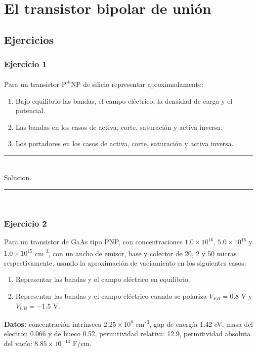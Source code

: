 
\chapter{El transistor bipolar de unión}



\section{Ejercicios}


\subsection{Ejercicio 1} 

Para un transistor P\textsuperscript{+}NP de silicio representar aproximadamente:
\begin{enumerate}[label=\alph*)]
    \item Bajo equilibrio las bandas, el campo eléctrico, la densidad de carga y el potencial.
    \item Las bandas en los casos de activa, corte, saturación y activa inversa.
    \item Los portadores en los casos de activa, corte, saturación y activa inversa.
\end{enumerate}

\rule{\textwidth}{0.1pt} \\[2pt]

Solucion.

\rule{\textwidth}{0.1pt} \\[2pt]


\subsection{Ejercicio 2} 
Para un transistor de GaAs tipo PNP, con concentraciones $1.0 \times 10^{16}$, $5.0 \times 10^{15}$ y $1.0 \times 10^{15}$ cm\textsuperscript{-3}, con un ancho de emisor, base y colector de 20, 2 y 50 micras respectivamente, usando la aproximación de vaciamiento en los siguientes casos:
    \begin{enumerate}[label=\alph*)]
        \item Representar las bandas y el campo eléctrico en equilibrio.
        \item Representar las bandas y el campo eléctrico cuando se polariza $V_{EB} = 0.8$ V y $V_{CB} = -1.5$ V.
    \end{enumerate}
\textbf{Datos:} concentración intrínseca $2.25 \times 10^6$ cm\textsuperscript{-3}, gap de energía 1.42 eV, masa del electrón 0.066 y de hueco 0.52, permitividad relativa: 12.9, permitividad absoluta del vacío: $8.85 \times 10^{-14}$ F/cm.

